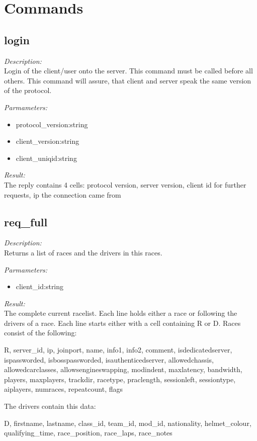 \section{Commands}

\subsection{login}

\begin{description}
\item {\it Description:}\\
Login of the client/user onto the server. This command must be called before all others. This command will assure, that client and server speak the same version of the protocol.
\item {\it Parmameters:}
\begin{itemize}
\item protocol\_version:string
\item client\_version:string
\item client\_uniqid:string
\end{itemize}
\item {\it Result:}\\
The reply contains 4 cells: protocol version, server version, client id for further requests, ip the connection came from
\end{description}

\subsection{req\_full}

\begin{description}
\item {\it Description:}\\
Returns a list of races and the drivers in this races.
\item {\it Parmameters:}
\begin{itemize}
\item client\_id:string
\end{itemize}
\item {\it Result:}\\
The complete current racelist. Each line holds either a race or following the drivers of a race. Each line starts either with a cell containing R or D. Races consist of the following: 
			
		R, 
		server\_id, 
		ip, 
		joinport, 
		name, 
		info1, 
		info2, 
		comment, 
		isdedicatedserver, 
		ispassworded, 
		isbosspassworded, 
		isauthenticedserver, 
		allowedchassis, 
		allowedcarclasses, 
		allowsengineswapping, 
		modindent, 
		maxlatency, 
		bandwidth, 
		players,
		maxplayers, 
		trackdir, 
		racetype, 
		praclength, 
		sessionleft, 
		sessiontype,
		aiplayers,
		numraces,
		repeatcount,
		flags


		The drivers contain this data:

		D,
		firstname,
		lastname,
		class\_id,
		team\_id,
		mod\_id,
		nationality,
		helmet\_colour,
		qualifying\_time,
		race\_position,
		race\_laps,
		race\_notes
		
\end{description}

